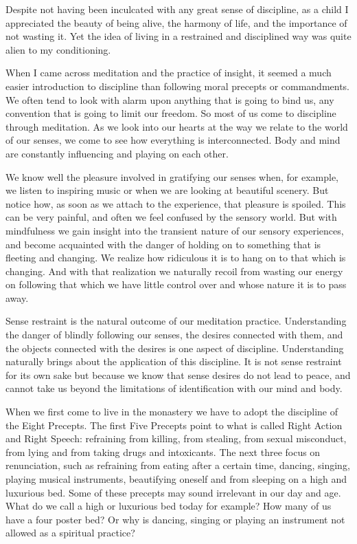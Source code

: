 Despite not having been inculcated with any great sense of discipline, as a child I appreciated the beauty of being alive, the harmony of life, and the importance of not wasting it. Yet the idea of living in a restrained and disciplined way was quite alien to my conditioning.

When I came across meditation and the practice of insight, it seemed a much easier introduction to discipline than following moral precepts or commandments. We often tend to look with alarm upon anything that is going to bind us, any convention that is going to limit our freedom. So most of us come to discipline through meditation. As we look into our hearts at the way we relate to the world of our senses, we come to see how everything is interconnected. Body and mind are constantly influencing and playing on each other.

We know well the pleasure involved in gratifying our senses when, for example, we listen to inspiring music or when we are looking at beautiful scenery. But notice how, as soon as we attach to the experience, that pleasure is spoiled. This can be very painful, and often we feel confused by the sensory world. But with mindfulness we gain insight into the transient nature of our sensory experiences, and become acquainted with the danger of holding on to something that is fleeting and changing. We realize how ridiculous it is to hang on to that which is changing. And with that realization we naturally recoil from wasting our energy on following that which we have little control over and whose nature it is to pass away.

Sense restraint is the natural outcome of our meditation practice. Understanding the danger of blindly following our senses, the desires connected with them, and the objects connected with the desires is one aspect of discipline. Understanding naturally brings about the application of this discipline. It is not sense restraint for its own sake but because we know that sense desires do not lead to peace, and cannot take us beyond the limitations of identification with our mind and body.

When we first come to live in the monastery we have to adopt the discipline of the Eight Precepts. The first Five Precepts point to what is called Right Action and Right Speech: refraining from killing, from stealing, from sexual misconduct, from lying and from taking drugs and intoxicants. The next three focus on renunciation, such as refraining from eating after a certain time, dancing, singing, playing musical instruments, beautifying oneself and from sleeping on a high and luxurious bed. Some of these precepts may sound irrelevant in our day and age. What do we call a high or luxurious bed today for example? How many of us have a four poster bed? Or why is dancing, singing or playing an instrument not allowed as a spiritual practice?

